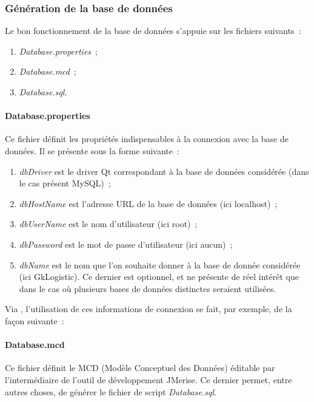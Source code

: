 \subsubsection{Génération de la base de données}
Le bon fonctionnement de la base de données s'appuie sur les fichiers suivants~:
\begin{enumerate}
	\item \emph{Database.properties}~;
	\item \emph{Database.mcd}~;
	\item \emph{Database.sql}.
\end{enumerate}

\paragraph{Database.properties}
Ce fichier définit les propriétés indispensables à la connexion avec la base de données.
Il se présente sous la forme suivante~:

\label{Database.properties}
\begin{enumerate}
	\item \emph{dbDriver} est le driver Qt correspondant à la base de données considérée (dans le cas présent MySQL)~;
	\item \emph{dbHostName} est l'adresse URL de la base de données (ici localhost)~;
	\item \emph{dbUserName} est le nom d'utilisateur (ici root)~;
	\item \emph{dbPassword} est le mot de passe d'utilisateur (ici aucun)~;
	\item \emph{dbName} est le nom que l'on souhaite donner à la base de donnée considérée (ici GkLogistic). Ce dernier est optionnel, et ne présente de réel intérêt que dans le cas où plusieurs bases de données distinctes seraient utilisées.
\end{enumerate}
Via \Qt, l'utilisation de ces informations de connexion se fait, par exemple, de la façon suivante~:

\label{Database.example.cpp}

\paragraph{Database.mcd}
Ce fichier définit le MCD (Modèle Conceptuel des Données) éditable par l'intermédiaire de l'outil de développement JMerise.
Ce dernier permet, entre autres choses, de générer le fichier de script \emph{Database.sql}.

